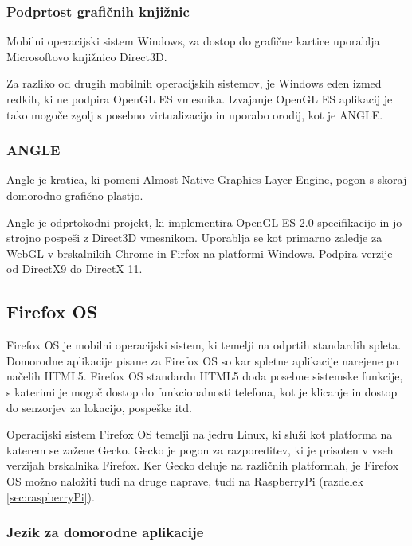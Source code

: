 \subsubsection{Podprtost grafičnih knjižnic}

Mobilni operacijski sistem Windows, za dostop do grafične kartice uporablja Microsoftovo knjižnico Direct3D. %

Za razliko od drugih mobilnih operacijskih sistemov, je Windows eden izmed redkih, ki ne podpira OpenGL ES vmesnika. Izvajanje OpenGL ES aplikacij je tako mogoče zgolj s posebno virtualizacijo in uporabo orodij, kot je ANGLE.

\subsubsection{ANGLE}
Angle \cite{angle} je kratica, ki pomeni Almost Native Graphics Layer Engine, pogon s skoraj domorodno grafično plastjo.

Angle je odprtokodni projekt, ki implementira OpenGL ES 2.0 specifikacijo in jo strojno pospeši z Direct3D vmesnikom. Uporablja se kot primarno zaledje za WebGL v brskalnikih Chrome in Firfox na platformi Windows. Podpira verzije od DirectX9 do DirectX 11.  

\subsection{Firefox OS}

Firefox OS \cite{firefoxos} je mobilni operacijski sistem, ki temelji na odprtih standardih spleta. Domorodne aplikacije pisane za Firefox OS so kar spletne aplikacije narejene po načelih HTML5. Firefox OS standardu HTML5 doda posebne sistemske funkcije, s katerimi je mogoč dostop do funkcionalnosti telefona, kot je klicanje in dostop do senzorjev za lokacijo, pospeške itd.

Operacijski sistem Firefox OS temelji na jedru Linux, ki služi kot platforma na katerem se zažene Gecko. Gecko je pogon za razporeditev, ki je prisoten v vseh verzijah brskalnika Firefox. Ker Gecko deluje na različnih platformah, je Firefox OS možno naložiti tudi na druge naprave, tudi na RaspberryPi (razdelek \ref{sec:raspberryPi}). 

\subsubsection{Jezik za domorodne aplikacije}

